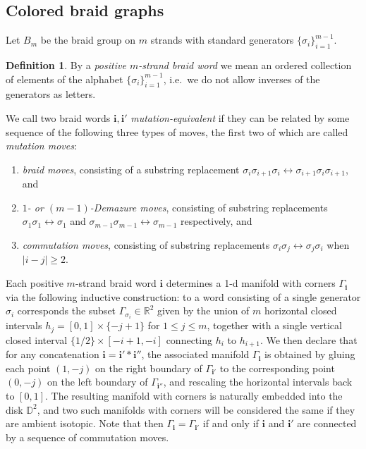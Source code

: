 \documentclass[11pt, reqno]{amsart}
\theoremstyle{definition}
\newtheorem{defn}[theorem]{Definition}
\numberwithin{equation}{section}
\newcommand{\mbi}{\mathbf{i}}
\begin{document}
\subsection{Colored braid graphs}\label{SecStandGenPrel}
Let $B_m$ be the braid group on $m$ strands with standard generators $\{\sigma_i\}_{i=1}^{m-1}$. 

 
\begin{defn}
By a \emph{positive $m$-strand braid word} we mean an ordered collection of elements of the alphabet $\{\sigma_i\}_{i=1}^{m-1}$, i.e.\ we do not allow inverses of the generators as letters. 

We call two braid words $\mathbf{i},\mathbf{i}'$ \emph{mutation-equivalent} if they can be related by some sequence of the following three types of moves, the first two of which are called  \emph{mutation moves}:
\begin{enumerate}
\item \emph{braid moves}, consisting of a substring replacement $\sigma_i\sigma_{i+1}\sigma_i\leftrightarrow\sigma_{i+1}\sigma_i\sigma_{i+1}$,  and 
\item \emph{$1$- or ${(m-1)}$-Demazure moves}, consisting of substring replacements $\sigma_1\sigma_1 \leftrightarrow \sigma_1$ and $\sigma_{m-1}\sigma_{m-1} \leftrightarrow \sigma_{m-1}$ respectively, and
\item \emph{commutation moves}, consisting of substring replacements $\sigma_i\sigma_j\leftrightarrow \sigma_j\sigma_{i}$ when $|i-j|\geq 2$. 
\end{enumerate}
\end{defn}


Each positive $m$-strand braid word $\mbi$ determines a 1-d manifold with corners $\Gamma_{\mathbf i}$ via the following inductive construction: to a word consisting of a single generator $\sigma_i$ corresponds the subset $\Gamma_{\sigma_i}\in\mathbb{R}^2$ given by the union of $m$ horizontal closed intervals $h_j=[0,1]\times \{-j+1\}$ for $1\leq j \leq m$, together with a single vertical closed interval $\{1/2\}\times[-i+1,-i]$ connecting $h_{i}$ to $h_{i+1}$. We then declare that for any concatenation $\mathbf{i}= \mathbf{i}'*\mathbf{i}''$, the associated manifold $\Gamma_{\mathbf i}$ is obtained by gluing each point $(1,-j)$ on the right boundary of $\Gamma_{\mathbf{i}'}$ to the corresponding point $(0,-j)$ on the left boundary of $\Gamma_{\mathbf {i}''}$, and rescaling the horizontal intervals back to $[0,1]$. The resulting manifold with corners is naturally embedded into the disk $\mathbb{D}^2$, and two such manifolds with corners will be considered the same if they are ambient isotopic.	Note that then $\Gamma_{\mbi}=\Gamma_{\mbi'}$  if and only if $\mbi$ and $\mbi'$ are connected by a sequence of commutation moves. 
\end{document}
